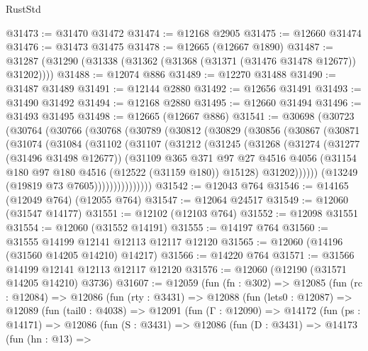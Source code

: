 \begin{lexlean}{RustStd}
\begin{coremodule}
@31473 := @31470 @31472
@31474 := @12168 @2905
@31475 := @12660 @31474
@31476 := @31473 @31475
@31478 := @12665 (@12667 @1890)
@31487 := @31287 (@31290 (@31338 (@31362 (@31368 (@31371 (@31476 @31478 @12677)) @31202))))
@31488 := @12074 @886
@31489 := @12270 @31488
@31490 := @31487 @31489
@31491 := @12144 @2880
@31492 := @12656 @31491
@31493 := @31490 @31492
@31494 := @12168 @2880
@31495 := @12660 @31494
@31496 := @31493 @31495
@31498 := @12665 (@12667 @886)
@31541 := @30698
    (@30723
      (@30764
        (@30766
          (@30768
            (@30789
              (@30812
                (@30829
                  (@30856
                    (@30867
                      (@30871
                        (@31074
                          (@31084
                            (@31102
                              (@31107
                                (@31212
                                  (@31245
                                    (@31268
                                      (@31274
                                        (@31277 (@31496 @31498 @12677))
                                        (@31109
                                          @365
                                          @371
                                          @97
                                          @27
                                          @4516
                                          @4056
                                          (@31154 @180 @97 @180 @4516 (@12522 (@31159 @180)) @15128)
                                          @31202))))))
                              (@13249 (@19819 @73 @7605)))))))))))))))
@31542 := @12043 @764
@31546 := @14165 (@12049 @764) (@12055 @764)
@31547 := @12064 @24517
@31549 := @12060 (@31547 @14177)
@31551 := @12102 (@12103 @764)
@31552 := @12098 @31551
@31554 := @12060 (@31552 @14191)
@31555 := @14197 @764
@31560 := @31555 @14199 @12141 @12113 @12117 @12120
@31565 := @12060 (@14196 (@31560 @14205 @14210) @14217)
@31566 := @14220 @764
@31571 := @31566 @14199 @12141 @12113 @12117 @12120
@31576 := @12060 (@12190 (@31571 @14205 @14210) @3736)
@31607 := @12059
    (fun (fn : @302) =>
    @12085
      (fun (rc : @12084) =>
      @12086
        (fun (rty : @3431) =>
        @12088
          (fun (lets0 : @12087) =>
          @12089
            (fun (tail0 : @4038) =>
            @12091
              (fun (Γ : @12090) =>
              @14172
                (fun (ps : @14171) =>
                @12086
                  (fun (S : @3431) =>
                  @12086
                    (fun (D : @3431) =>
                    @14173
                      (fun (hn : @13) =>

\end{coremodule}
\end{lexlean}
